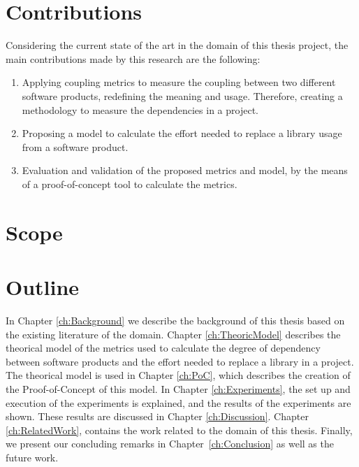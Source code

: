 \section{Contributions}
Considering the current state of the art in the domain of this thesis project, the main contributions made by this research are the following:

\begin{enumerate}
	\item Applying coupling metrics to measure the coupling between two different software products, redefining the meaning and usage. Therefore, creating a methodology to measure the dependencies in a project.
	\item Proposing a model to calculate the effort needed to replace a library usage from a software product.
	\item Evaluation and validation of the proposed metrics and model, by the means of a proof-of-concept tool to calculate the metrics.
\end{enumerate}

\section{Scope} %


\section{Outline}
In Chapter \ref{ch:Background} we describe the background of this thesis based on the existing literature of the domain.
Chapter \ref{ch:TheoricModel} describes the theorical model of the metrics used to calculate the degree of dependency between software products and the effort needed to replace a library in a project.
The theorical model is used in Chapter \ref{ch:PoC}, which describes the creation of the Proof-of-Concept of this model.
In Chapter \ref{ch:Experiments}, the set up and execution of the experiments is explained, and the results of the experiments are shown. These results are discussed in Chapter \ref{ch:Discussion}. Chapter \ref{ch:RelatedWork}, contains the work related to the domain of this thesis.
Finally, we present our concluding remarks in Chapter~\ref{ch:Conclusion} as well as the future work.

